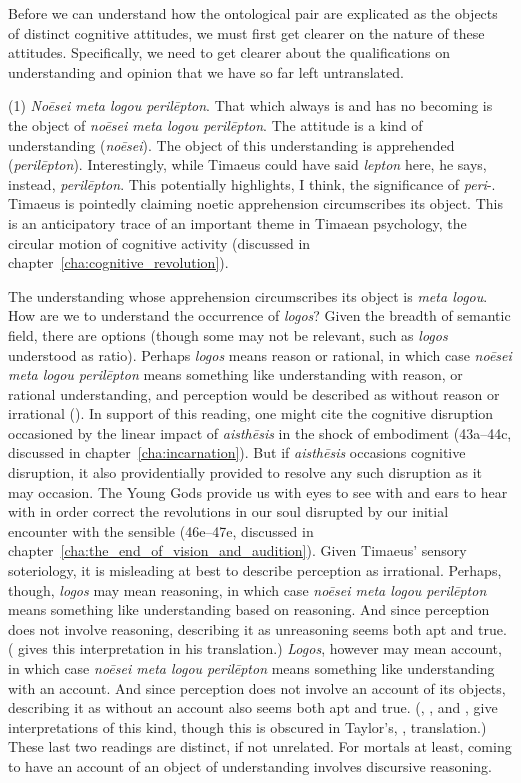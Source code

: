 Before we can understand how the ontological pair are explicated as the objects of distinct cognitive attitudes, we must first get clearer on the nature of these attitudes. Specifically, we need to get clearer about the qualifications on understanding and opinion that we have so far left untranslated. 

(1) \emph{Noēsei meta logou perilēpton}. That which always is and has no becoming is the object of \emph{noēsei meta logou perilēpton}. The attitude is a kind of understanding (\emph{noēsei}). The object of this understanding is apprehended (\emph{perilēpton}). Interestingly, while Timaeus could have said \emph{lepton} here, he says, instead, \emph{perilēpton}. This potentially highlights, I think, the significance of \emph{peri}-. Timaeus is pointedly claiming noetic apprehension circumscribes its object. This is an anticipatory trace of an important theme in Timaean psychology, the circular motion of cognitive activity (discussed in chapter~\ref{cha:cognitive_revolution}).

The understanding whose apprehension circumscribes its object is \emph{meta logou}. How are we to understand the occurrence of \emph{logos}? Given the breadth of semantic field, there are options (though some may not be relevant, such as \emph{logos} understood as ratio). Perhaps \emph{logos} means reason or rational, in which case \emph{noēsei meta logou perilēpton} means something like understanding with reason, or rational understanding, and perception would be described as without reason or irrational (\citealt[87]{Archer-Hind:1888qd}). In support of this reading, one might cite the cognitive disruption occasioned by the linear impact of \emph{aisthēsis} in the shock of embodiment (43a--44c, discussed in chapter~\ref{cha:incarnation}). But if \emph{aisthēsis} occasions cognitive disruption, it also providentially provided to resolve any such disruption as it may occasion. The Young Gods provide us with eyes to see with and ears to hear with in order correct the revolutions in our soul disrupted by our initial encounter with the sensible (46e--47e, discussed in chapter~\ref{cha:the_end_of_vision_and_audition}). Given Timaeus' sensory soteriology, it is misleading at best to describe perception as irrational. Perhaps, though, \emph{logos} may mean reasoning, in which case \emph{noēsei meta logou perilēpton} means something like understanding based on reasoning. And since perception does not involve reasoning, describing it as unreasoning seems both apt and true. (\citealt{Bury:1929jb} gives this interpretation in his translation.) \emph{Logos}, however may mean account, in which case \emph{noēsei meta logou perilēpton} means something like understanding with an account. And since perception does not involve an account of its objects, describing it as without an account also seems both apt and true. (\citealt[61]{Taylor:1928qb}, \citealt[22]{Cornford:1935fk}, and \citealt[16]{Waterfield:2008lx}, give interpretations of this kind, though this is obscured in Taylor's, \citeyear[25]{Taylor:1929ov}, translation.) These last two readings are distinct, if not unrelated. For mortals at least, coming to have an account of an object of understanding involves discursive reasoning.

